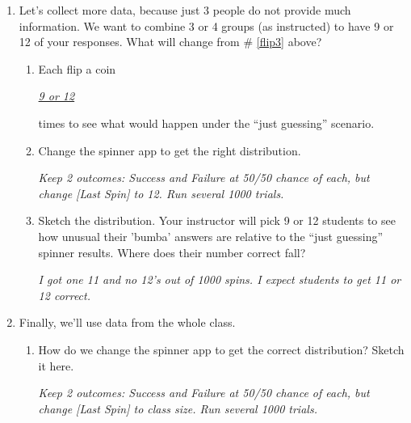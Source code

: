 \begin{enumerate}
  \item Let's collect more data, because just 3 people do not provide 
    much information.  We want to combine 3 or 4 groups (as instructed) to have
    9 or 12 of your responses. What will change from \# \ref{flip3} above? \\
    \begin{enumerate}
    \item Each flip a coin \underline{\hspace{.5in}} 
\begin{key}
   {\it \underline{9 or 12}}
\end{key}
        times to see
      what would happen under the ``just guessing'' scenario. 
    \item Change the spinner app to get the right  distribution.
\begin{students}
  \vspace{2cm}
\end{students}    
\begin{key}
   {\it Keep 2 outcomes: Success and Failure at 50/50 chance of each,
     but change [Last Spin] to 12. Run several 1000 trials. }
\end{key}
   

\item Sketch the distribution. Your instructor will pick 9 or 12 students
  to see how unusual their 'bumba' answers are relative to the
  ``just guessing'' spinner results. Where does their number
  correct fall?
\begin{students}
  \vspace{3cm}
\end{students}    
\begin{key}
   {\it I got one 11 and no 12's out of 1000 spins. I expect students
     to get 11 or 12 correct.}
\end{key}
    \end{enumerate}


\item Finally, we'll use data from the whole class. 
    \begin{enumerate}
    \item How do we change the spinner app to get the correct
      distribution?  Sketch it here.
\begin{students}
  \vspace{4cm}
\end{students}    
\begin{key}
   {\it Keep 2 outcomes: Success and Failure at 50/50 chance of each,
     but change [Last Spin] to class size. Run several 1000 trials. }
\end{key}


\end{enumerate}
\end{enumerate}
